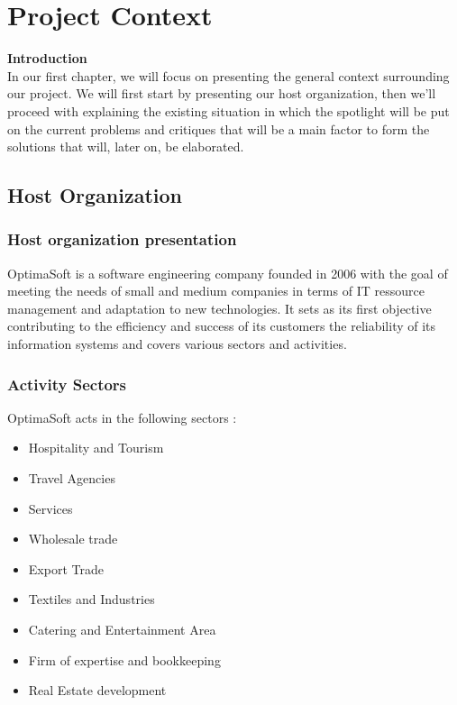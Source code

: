 \documentclass{report}
\begin{document}
\chapter{Project Context}

\textbf{\Large Introduction}
\vspace{30px}
\textnormal{
\\In our first chapter, we will focus on presenting the general context surrounding our project. We will first start by presenting our host organization, then we'll proceed with explaining the existing situation in which the spotlight will be put on the current problems and critiques that will be a main factor to form the solutions that will, later on, be elaborated.}

\section{Host Organization}
\subsection{Host organization presentation}
\textnormal{
OptimaSoft is a software engineering company founded in 2006 with the goal of meeting the needs of small and medium companies in terms of IT ressource management and adaptation to new technologies. It sets as its first objective contributing to the efficiency and success of its customers  the reliability of its information systems and covers various sectors and activities.
}
\subsection{Activity Sectors}
\textnormal{
OptimaSoft acts in the following sectors : 
}
\begin{itemize}
\item [\ding{51}]  Hospitality and Tourism
\item  [\ding{51}]Travel Agencies
\item [\ding{51}]Services
\item [\ding{51}]Wholesale trade
\item [\ding{51}]Export Trade
\item [\ding{51}]Textiles and Industries
\item [\ding{51}]Catering and Entertainment Area
\item [\ding{51}]Firm of expertise and bookkeeping 
\item[\ding{51}] Real Estate development
\end{itemize}
\end{document}
